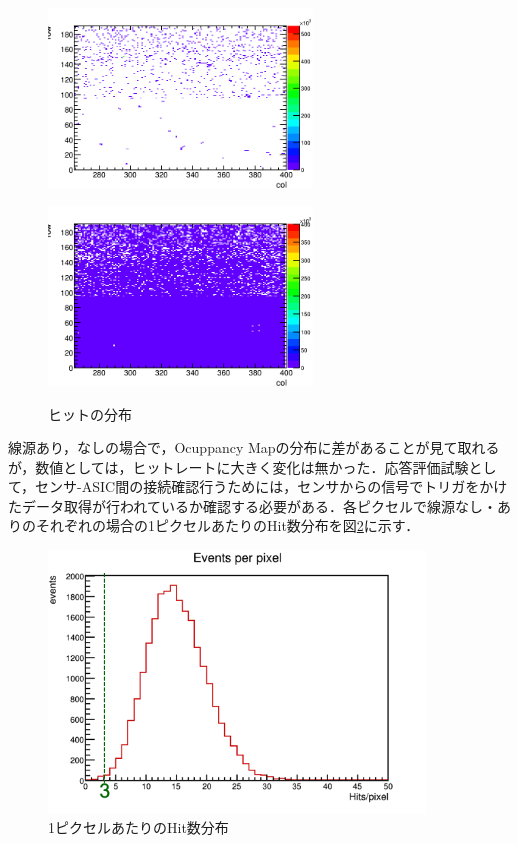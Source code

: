 \begin{figure}[h]
  \centering
  \begin{minipage}[b]{0.45\linewidth}
    \centering
    \includegraphics[width=7cm]{./figure/selftrigwo.png}
    \label{fig:selfwo}
  \end{minipage}
  \begin{minipage}[b]{0.45\linewidth}
    \centering
    \includegraphics[width=7cm]{./figure/selftrigw.png}
    \label{fig:selfo}
  \end{minipage}
  \caption{ヒットの分布}
  \label{fig:self}
\end{figure}

線源あり，なしの場合で，Ocuppancy Mapの分布に差があることが見て取れるが，数値としては，ヒットレートに大きく変化は無かった．応答評価試験として，センサ-ASIC間の接続確認行うためには，センサからの信号でトリガをかけたデータ取得が行われているか確認する必要がある．各ピクセルで線源なし・ありのそれぞれの場合の1ピクセルあたりのHit数分布を図\ref{fig:selfhitfreq}に示す．

\begin{figure}[h]
  \centering
  \includegraphics[width=10cm]{./figure/selfperpix.png}
  \caption{1ピクセルあたりのHit数分布}
  \label{fig:selfhitfreq}
\end{figure}

